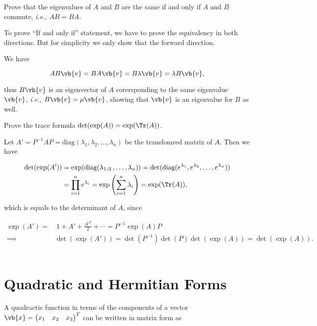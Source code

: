\documentclass[a4paper,12pt]{report}
\begin{document}
{Prove that the eigenvalues of \(A \text { and } B\) are the same if and only if \(A \text { and } B\) commute, \textit{i.e.,} \(AB=BA\).   }
{To prove ``If and only if'' statement, we have to prove the equivalency in both directions. But for simplicity we only show that the forward direction.

We have 

\begin{equation}
    AB \vb{v} = BA \vb{v} = B \lambda \vb{v} = \lambda B \vb{v},
\end{equation}

thus \(B \vb{v} \) is an eigenvector of \(A\) corersponding to the same eigenvalue \(\vb{v} \), \textit{i.e.,} \(B \vb{v} = \mu \vb{v}   \), showing that \(\vb{v} \) is an eigenvalue for \(B\) as well. 
} 

{Prove the trace formula \(\det (\exp (A)) = \exp (\Tr (A)) \).}
{Let \(A' = P^{-1} AP = \text{diag} (\lambda _{1}, \lambda _{2}, \ldots , \lambda _{n}   )\) be the transfomred matrix of \(A\). Then we have

\begin{equation}
    \begin{aligned} 
    \det (\exp (A')) &= \exp (\text{diag} (\lambda _{1}, _{2}, \ldots ,\lambda _{n}   )) = \det (\text{diag} (e^{\lambda _{1} }, e^{\lambda _{2} },\ldots , e^{\lambda _{n} }   )) \\ &= \prod_{i=1}^{n} e^{\lambda _{i} } = \exp \left( \sum_{i=1}^{n} \lambda _{i}  \right) = \exp (\Tr (A)),
    \end{aligned} 
\end{equation}

which is equals to the determinant of \(A\), since


\begin{equation}
    \begin{aligned} 
    \exp (A') = &~1+A'+\frac{A'^2}{2} + \cdots = P^{-1} \exp (A) P \\
    \implies &\det (\exp (A')) = \det (P^{-1} ) \det (P) \det (\exp (A)) = \det (\exp (A)).
    \end{aligned} 
\end{equation}~
} 


\section{Quadratic and Hermitian Forms}

A quadractic function in terms of the components of a vector \(\vb{x} = \begin{pmatrix}
    x_1  & x_2  & x_3   \\
\end{pmatrix}^T \) can be written in matrix form as 
\end{document}

